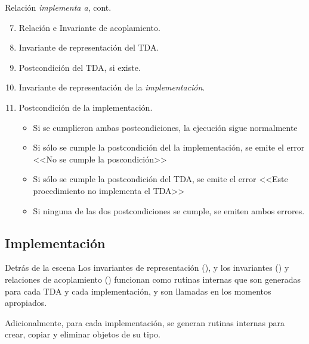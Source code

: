 \begin{frame}{Relación \textit{implementa a}, cont.}
\begin{enumerate}\setcounter{enumi}{6}
  \item Relación e Invariante de acoplamiento.

  \item Invariante de representación del TDA.

  \item Postcondición del TDA, si existe.

  \item Invariante de representación de la \textit{implementación}.

  \item Postcondición de la implementación.
    \begin{itemize}
      \item Si se cumplieron ambas postcondiciones, la ejecución sigue normalmente
      \item Si sólo se cumple la postcondición del la implementación, se emite el
      error <<No se cumple la poscondición>>
      \item Si sólo se cumple la postcondición del TDA, se emite el error <<Este
      procedimiento no implementa el TDA>>
      \item Si ninguna de las dos postcondiciones se cumple, se emiten ambos errores.
    \end{itemize}
\end{enumerate}
\end{frame}

\subsection*{Implementación}

\begin{frame}{Detrás de la escena}
Los invariantes de representación (), y los invariantes  () y relaciones de acoplamiento () funcionan como rutinas internas que son generadas para cada TDA y cada implementación, y son llamadas en los momentos apropiados. 

Adicionalmente, para cada implementación, se generan rutinas internas para crear, copiar y eliminar objetos de su tipo. 
\end{frame}

